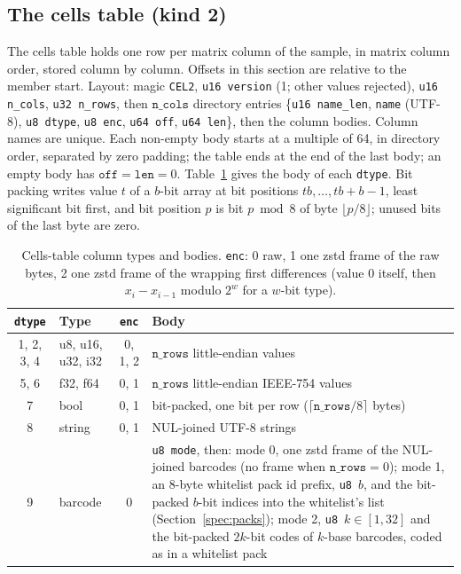\subsection{The cells table (kind 2)}
\label{spec:cells}
The cells table holds one row per matrix column of the sample, in matrix column order, stored column by column.
Offsets in this section are relative to the member start. Layout: magic \texttt{CEL2}, \texttt{u16 version} (1; other
values rejected), \texttt{u16 n\_cols}, \texttt{u32 n\_rows}, then $\texttt{n\_cols}$ directory entries
\{\texttt{u16 name\_len}, \texttt{name} (UTF-8), \texttt{u8 dtype}, \texttt{u8 enc}, \texttt{u64 off}, \texttt{u64 len}\},
then the column bodies. Column names are unique. Each non-empty body starts at a multiple of 64, in directory order,
separated by zero padding; the table ends at the end of the last body; an empty body has $\texttt{off}=\texttt{len}=0$.
Table~\ref{spec:tab:cells} gives the body of each \texttt{dtype}. Bit packing writes value $t$ of a $b$-bit array at bit
positions $tb,\dots,tb+b-1$, least significant bit first, and bit position $p$ is bit $p\bmod 8$ of byte $\lfloor
p/8\rfloor$; unused bits of the last byte are zero.

\begin{table}[htbp]
\centering\footnotesize\setlength{\tabcolsep}{4pt}
\caption{Cells-table column types and bodies. \texttt{enc}: 0 raw, 1 one zstd frame of the raw bytes, 2 one zstd frame of
the wrapping first differences (value 0 itself, then $x_i-x_{i-1}$ modulo $2^{w}$ for a $w$-bit type).}
\label{spec:tab:cells}
\begin{tabularx}{\linewidth}{@{}clcX@{}}
\toprule
\texttt{dtype} & Type & \texttt{enc} & Body \\
\midrule
1, 2, 3, 4 & u8, u16, u32, i32 & 0, 1, 2 & $\texttt{n\_rows}$ little-endian values \\
5, 6 & f32, f64 & 0, 1 & $\texttt{n\_rows}$ little-endian IEEE-754 values \\
7 & bool & 0, 1 & bit-packed, one bit per row ($\lceil\texttt{n\_rows}/8\rceil$ bytes) \\
8 & string & 0, 1 & NUL-joined UTF-8 strings \\
9 & barcode & 0 & \texttt{u8 mode}, then: mode 0, one zstd frame of the NUL-joined barcodes (no frame when $\texttt{n\_rows}=0$); mode 1, an 8-byte whitelist pack id prefix, \texttt{u8}~$b$, and the bit-packed $b$-bit indices into the whitelist's list (Section~\ref{spec:packs}); mode 2, \texttt{u8}~$k\in[1,32]$ and the bit-packed $2k$-bit codes of $k$-base barcodes, coded as in a whitelist pack \\
\bottomrule
\end{tabularx}
\end{table}

